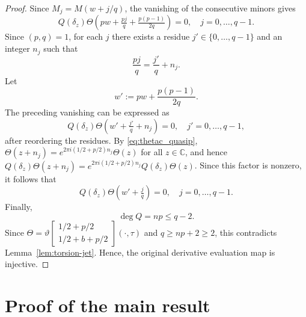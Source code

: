 \documentclass[reqno,a4paper,12pt]{amsart}
\numberwithin{equation}{section}
\newcommand{\C}{\mathbb C}
\newcommand{\dd}{\delta}
\newcommand{\thetac}[2]{{\vartheta\left[\begin{smallmatrix}
        #1 \\ #2
    \end{smallmatrix}\right]}}
\begin{document}
\begin{proof}
Since $M_j=M(w+j/q)$, the vanishing of the consecutive minors gives
$$
Q(\dd_z)\Theta\left(
pw+\tfrac{pj}{q}+\tfrac{p(p-1)}{2q}
\right)=0,
\quad j=0,\dots,q-1.
$$
Since $(p,q)=1$, for each $j$ there exists a residue $j'\in\{0,\dots,q-1\}$
and an integer $n_j$ such that
$$
\frac{pj}{q}=\frac{j'}{q}+n_j.
$$
Let
$$
w':=pw+\frac{p(p-1)}{2q}.
$$
The preceding vanishing can be expressed as
$$
Q(\dd_z) \Theta\left(w'+\tfrac{j'}{q}+n_j\right)=0,
\quad j'=0,\dots,q-1,
$$
after reordering the residues. 
By \eqref{eq:thetac_quasip}, $\Theta(z+n_j)=e^{2\pi i(1/2+p/2)n_j}\Theta(z)$ for all $z\in\C$, and hence $Q(\dd_z)\Theta(z+n_j)=e^{2\pi i(1/2+p/2)n_j}Q(\dd_z)\Theta(z)$. Since this factor is nonzero, it follows that
$$
Q(\dd_z)\Theta\left(w'+\tfrac{j}{q}\right)=0,
\quad j=0,\dots,q-1.
$$
Finally,
$$
\deg Q={{n}}p\leq q-2.
$$
Since $\Theta=\thetac{1/2+p/2}{1/2+b+p/2}(\cdot,\tau)$ and $q\geq np+2\geq 2$, this contradicts Lemma~\ref{lem:torsion-jet}. Hence, the original derivative evaluation map is injective.
\end{proof}


\section{Proof of the main result}
\end{document}
